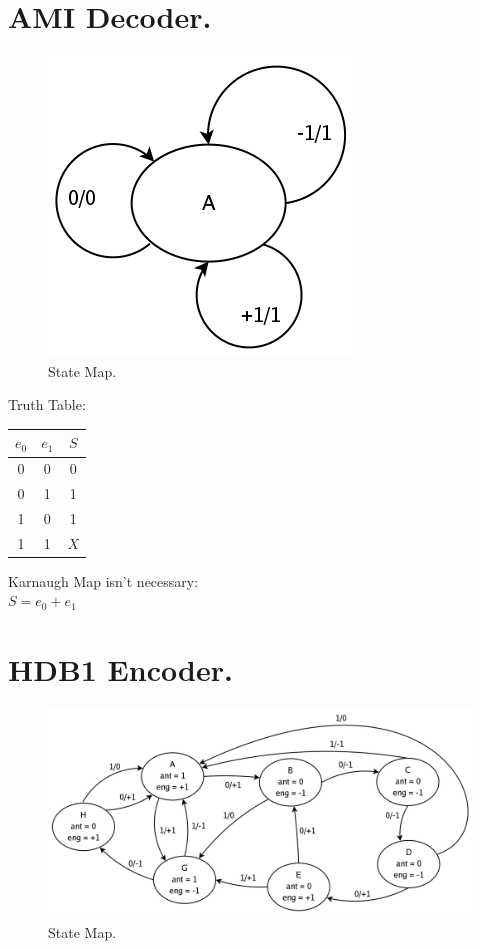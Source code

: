 \documentclass[11pt]{article}
\begin{document}
\section{AMI Decoder. }
\begin{multicols}{2}


\begin{figure}[H]
\centering
\includegraphics[scale=0.35]{estados-ami_dec}
\caption[ ]{\label{estados-ami_dec} State Map. }
\end{figure}


Truth Table: 

\begin{tabular}{|cc|c|}
\hline
$e_0$ & $e_1$ & $S$  \\
\hline
0 & 0 & 0 \\
0 & 1 & 1 \\
1 & 0 & 1 \\
1 & 1 & $X$ \\
\hline
\end{tabular}

\vspace{50pt}
Karnaugh Map isn't necessary: \\
$ S = e_0 + e_1 $ \\

\end{multicols}


\section{HDB1 Encoder. }
\begin{figure}[H]
\centering
\includegraphics[scale=0.35]{estados-hdb1_enc}
\caption[ ]{\label{estados-hdb1_enc} State Map. }
\end{figure}
\end{document}
